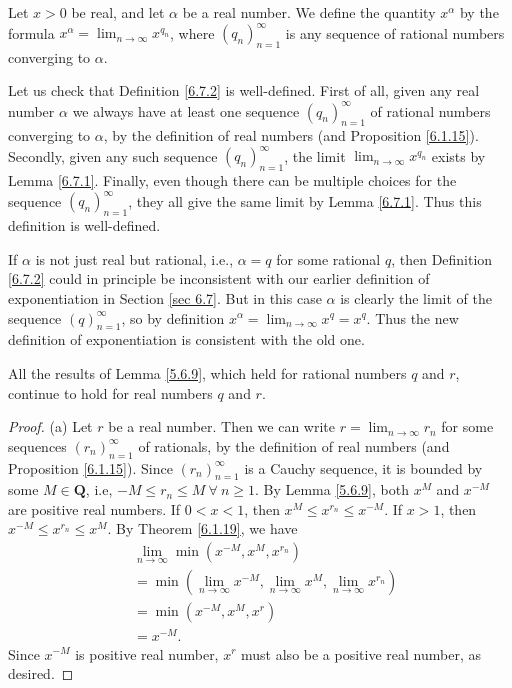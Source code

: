 \begin{definition}\label{6.7.2}
Let \(x > 0\) be real, and let \(\alpha\) be a real number.
We define the quantity \(x^\alpha\) by the formula \(x^\alpha = \lim_{n \to \infty} x^{q_n}\), where \((q_n)_{n = 1}^\infty\) is any sequence of rational numbers converging to \(\alpha\).
\end{definition}

\begin{note}
Let us check that Definition \ref{6.7.2} is well-defined.
First of all, given any real number \(\alpha\) we always have at least one sequence \((q_n)_{n = 1}^\infty\) of rational numbers converging to \(\alpha\), by the definition of real numbers (and Proposition \ref{6.1.15}).
Secondly, given any such sequence \((q_n)_{n = 1}^\infty\), the limit \(\lim_{n \to \infty} x^{q_n}\) exists by Lemma \ref{6.7.1}.
Finally, even though there can be multiple choices for the sequence \((q_n)_{n = 1}^\infty\), they all give the same limit by Lemma \ref{6.7.1}.
Thus this definition is well-defined.
\end{note}

\begin{note}
If \(\alpha\) is not just real but rational, i.e., \(\alpha = q\) for some rational \(q\), then Definition \ref{6.7.2} could in principle be inconsistent with our earlier definition of exponentiation in Section \ref{sec 6.7}.
But in this case \(\alpha\) is clearly the limit of the sequence \((q)_{n = 1}^\infty\), so by definition \(x^\alpha = \lim_{n \to \infty} x^q = x^q\).
Thus the new definition of exponentiation is consistent with the old one.
\end{note}

\begin{proposition}\label{6.7.3}
All the results of Lemma \ref{5.6.9}, which held for rational numbers \(q\) and \(r\), continue to hold for real numbers \(q\) and \(r\).
\end{proposition}

\begin{proof}{(a)}
Let \(r\) be a real number.
Then we can write \(r = \lim_{n \to \infty} r_n\) for some sequences \((r_n)_{n = 1}^\infty\) of rationals, by the definition of real numbers (and Proposition \ref{6.1.15}).
Since \((r_n)_{n = 1}^\infty\) is a Cauchy sequence, it is bounded by some \(M \in \mathbf{Q}\), i.e, \(-M \leq r_n \leq M \ \forall\ n \geq 1\).
By Lemma \ref{5.6.9}, both \(x^M\) and \(x^{-M}\) are positive real numbers.
If \(0 < x < 1\), then \(x^M \leq x^{r_n} \leq x^{-M}\).
If \(x > 1\), then \(x^{-M} \leq x^{r_n} \leq x^M\).
By Theorem \ref{6.1.19}, we have
\begin{align*}
& \lim_{n \to \infty} \min(x^{-M}, x^M, x^{r_n}) \\
&= \min(\lim_{n \to \infty} x^{-M}, \lim_{n \to \infty} x^M, \lim_{n \to \infty} x^{r_n}) \\
&= \min(x^{-M}, x^M, x^r) \\
&= x^{-M}.
\end{align*}
Since \(x^{-M}\) is positive real number, \(x^r\) must also be a positive real number, as desired.
\end{proof}

